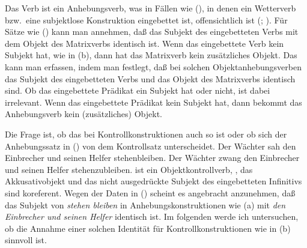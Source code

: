Das Verb  ist ein Anhebungsverb, was in Fällen wie
(), in denen ein Wetterverb bzw.\ eine subjektlose Konstruktion eingebettet
ist, offensichtlich ist (\citealp[]{Reis76c}; \citealp[]{Hoehle78a}).
\eal
{}
\zl
%
Für Sätze wie () kann man annehmen, daß das Subjekt des eingebetteten Verbs
mit dem Objekt des Matrixverbs identisch ist. Wenn das eingebettete Verb
kein Subjekt hat, wie in (b), dann hat das Matrixverb kein zusätzliches Objekt.
Das kann man erfassen, indem man festlegt, daß bei solchen Objektanhebungsverben das Subjekt
des eingebetteten Verbs und das Objekt des Matrixverbs identisch sind.
Ob das eingebettete Prädikat ein Subjekt hat oder nicht, ist dabei irrelevant.
Wenn das eingebettete Prädikat kein Subjekt hat, dann bekommt das Anhebungsverb kein
(zusätzliches) Objekt.

Die Frage ist, ob das bei Kontrollkonstruktionen auch so ist oder ob sich der Anhebungssatz in
() von dem Kontrollsatz unterscheidet.
\eal
\ex{}
Der Wächter sah den Einbrecher   und seinen Helfer stehenbleiben.
\ex{}
Der Wächter zwang den Einbrecher und seinen Helfer stehenzubleiben.
\zl
{} ist ein Objektkontrollverb, \dash, das Akkusativobjekt und das
nicht ausgedrückte Subjekt des eingebetteten Infinitivs sind koreferent.
Wegen der Daten in () scheint es angebracht anzunehmen, daß das Subjekt
von \emph{stehen bleiben} in Anhebungskonstruktionen wie (a)
mit \emph{den Einbrecher und seinen Helfer} identisch ist.
Im folgenden werde ich untersuchen, ob die Annahme einer solchen Identität für
Kontrollkonstruktionen wie in (b) sinnvoll ist.

